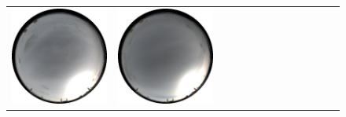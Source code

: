 \begin{figure}
\begin{tabular}{@{}rcccccccccccc@{}}
    \includegraphics[width=\customwidth]{./figures/database/20141108_150025.jpg} &
    \includegraphics[width=\customwidth]{./figures/database/20141108_153025.jpg} &

\end{tabular}
\end{figure}
